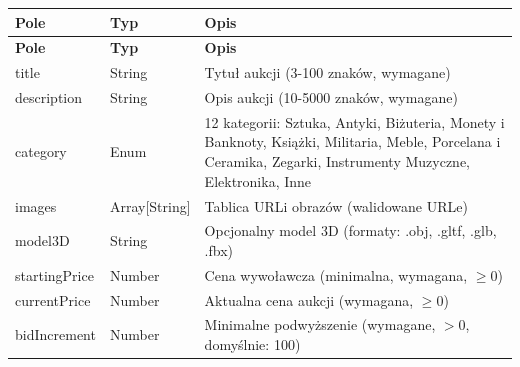 \begin{longtable}{|p{3.5cm}|p{2.5cm}|p{8cm}|}
  \hline
  \textbf{Pole} & \textbf{Typ}    & \textbf{Opis}                                                                                                                                                 \\ \hline
  \endfirsthead
  \hline
  \textbf{Pole} & \textbf{Typ}    & \textbf{Opis}                                                                                                                                                 \\ \hline
  \endhead

  title         & String          & Tytuł aukcji (3-100 znaków, wymagane)                                                                                                                         \\ \hline
  description   & String          & Opis aukcji (10-5000 znaków, wymagane)                                                                                                                        \\ \hline
  category      & Enum            & 12 kategorii: Sztuka, Antyki, Biżuteria, Monety i Banknoty, Książki, Militaria, Meble, Porcelana i Ceramika, Zegarki, Instrumenty Muzyczne, Elektronika, Inne \\ \hline
  images        & Array[String]   & Tablica URLi obrazów (walidowane URLe)                                                                                                                        \\ \hline
  model3D       & String          & Opcjonalny model 3D (formaty: .obj, .gltf, .glb, .fbx)                                                                                                        \\ \hline
  startingPrice & Number          & Cena wywoławcza (minimalna, wymagana, $\geq 0$)                                                                                                               \\ \hline
  currentPrice  & Number          & Aktualna cena aukcji (wymagana, $\geq 0$)                                                                                                                     \\ \hline
  bidIncrement  & Number          & Minimalne podwyższenie (wymagane, $> 0$, domyślnie: 100)                                                                                                      \\ \hline

\end{longtable}
